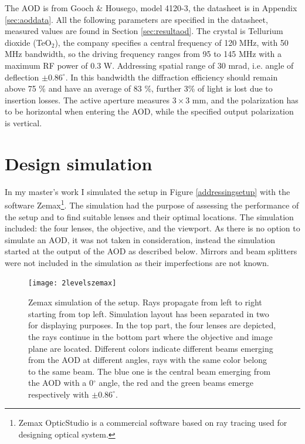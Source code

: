 The AOD is from Gooch \& Housego, model 4120-3, the datasheet is in Appendix \ref{sec:aoddata}. All the following parameters are specified in the datasheet, measured values are found in Section \ref{sec:resultaod}. The crystal is Tellurium dioxide (TeO$_2$), the company specifies a central frequency of 120 MHz, with 50 MHz bandwidth, so the driving frequency ranges from 95 to 145 MHz with a maximum RF power of 0.3 W. Addressing spatial range of 30 mrad, i.e. angle of deflection $\pm 0.86^{\circ}$. In this bandwidth the diffraction efficiency should remain above 75 \% and have an average of 83 \%, further 3\% of light is lost due to insertion losses. The active aperture measures $3\times 3$ mm, and the polarization has to be horizontal when entering the AOD, while the specified output polarization is vertical.

\section{Design simulation}
In my master's work I simulated the setup in Figure \ref{addressingsetup} with the software Zemax\footnote{Zemax OpticStudio is a commercial software based on ray tracing used for designing optical system.}. The simulation had the purpose of assessing the performance of the setup and to find suitable lenses and their optimal locations. The simulation included: the four lenses, the objective, and the viewport. As there is no option to simulate an AOD, it was not taken in consideration, instead the simulation started at the output of the AOD as described below. Mirrors and beam splitters were not included in the simulation as their imperfections are not known.
\begin{figure}[H]
\centering
\texttt{[image: 2levelszemax]}
\caption{Zemax simulation of the setup. Rays propagate from left to right starting from top left. Simulation layout has been separated in two for displaying purposes. In the top part, the four lenses are depicted, the rays continue in the bottom part where the objective and image plane are located. Different colors indicate different beams emerging from the AOD at different angles, rays with the same color belong to the same beam. The blue one is the central beam emerging from the AOD with a 0$^\circ$ angle, the red and the green beams emerge respectively with $\pm0.86^\circ$.}
\label{zemaxview}
\end{figure}
